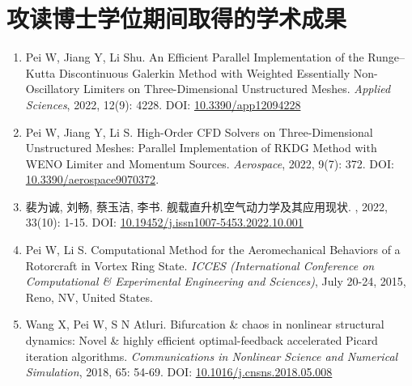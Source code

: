 \chapter{攻读博士学位期间取得的学术成果}

\begin{enumerate}
\item
Pei W, Jiang Y, Li Shu. An Efficient Parallel Implementation of the Runge–Kutta Discontinuous Galerkin Method with Weighted Essentially Non-Oscillatory Limiters on Three-Dimensional Unstructured Meshes. \textit{Applied Sciences}, 2022, 12(9): 4228.
DOI: \href{https://doi.org/10.3390/app12094228}{10.3390/app12094228}

\item
Pei W, Jiang Y, Li S. High-Order CFD Solvers on Three-Dimensional Unstructured Meshes: Parallel Implementation of RKDG Method with WENO Limiter and Momentum Sources. \textit{Aerospace}, 2022, 9(7): 372.
DOI: \href{https://doi.org/10.3390/aerospace9070372}{10.3390/aerospace9070372}.

\item
裴为诚, 刘畅, 蔡玉洁, 李书. 舰载直升机空气动力学及其应用现状. , 2022, 33(10): 1-15.
DOI: \href{https://doi.org/10.19452/j.issn1007-5453.2022.10.001}{10.19452/j.issn1007-5453.2022.10.001}

\item
Pei W, Li S. Computational Method for the Aeromechanical Behaviors of a Rotorcraft in Vortex Ring State. \textit{ICCES (International Conference on Computational \& Experimental Engineering and Sciences)}, July 20-24, 2015, Reno, NV, United States.

\item
Wang X, Pei W, S N Atluri. 
Bifurcation \& chaos in nonlinear structural dynamics: Novel \& highly efficient optimal-feedback accelerated Picard iteration algorithms. \textit{Communications in Nonlinear Science and Numerical Simulation}, 2018, 65: 54-69.
DOI: \href{https://doi.org/10.1016/j.cnsns.2018.05.008}{10.1016/j.cnsns.2018.05.008}
\end{enumerate}

